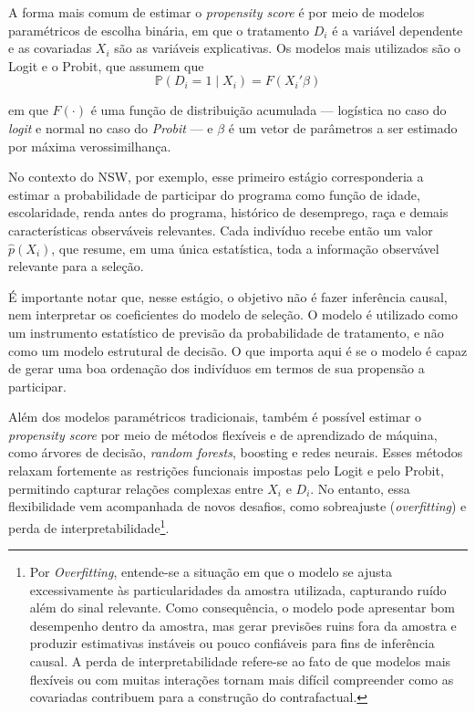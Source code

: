 A forma mais comum de estimar o \textit{propensity score} é por meio de modelos paramétricos de escolha binária, em que o tratamento $D_i$ é a variável dependente e as covariadas $X_i$ são as variáveis explicativas. Os modelos mais utilizados são o Logit e o Probit, que assumem que
$$
\mathbb{P}(D_i = 1 \mid X_i) = F(X_i'\beta)
$$

\noindent em que $F(\cdot)$ é uma função de distribuição acumulada --- logística no caso do \textit{logit} e normal no caso do \textit{Probit} --- e $\beta$ é um vetor de parâmetros a ser estimado por máxima verossimilhança.

No contexto do NSW, por exemplo, esse primeiro estágio corresponderia a estimar a probabilidade de participar do programa como função de idade, escolaridade, renda antes do programa, histórico de desemprego, raça e demais características observáveis relevantes. Cada indivíduo recebe então um valor $\hat{p}(X_i)$, que resume, em uma única estatística, toda a informação observável relevante para a seleção.

É importante notar que, nesse estágio, o objetivo não é fazer inferência causal, nem interpretar os coeficientes do modelo de seleção. O modelo é utilizado como um instrumento estatístico de previsão da probabilidade de tratamento, e não como um modelo estrutural de decisão. O que importa aqui é se o modelo é capaz de gerar uma boa ordenação dos indivíduos em termos de sua propensão a participar.

Além dos modelos paramétricos tradicionais, também é possível estimar o \textit{propensity score} por meio de métodos flexíveis e de aprendizado de máquina, como árvores de decisão, \textit{random forests}, boosting e redes neurais. Esses métodos relaxam fortemente as restrições funcionais impostas pelo Logit e pelo Probit, permitindo capturar relações complexas entre $X_i$ e $D_i$. No entanto, essa flexibilidade vem acompanhada de novos desafios, como sobreajuste (\textit{overfitting}) e perda de interpretabilidade\footnote{Por \textit{Overfitting}, entende-se a situação em que o modelo se ajusta excessivamente às particularidades da amostra utilizada, capturando ruído além do sinal relevante. Como consequência, o modelo pode apresentar bom desempenho dentro da amostra, mas gerar previsões ruins fora da amostra e produzir estimativas instáveis ou pouco confiáveis para fins de inferência causal. A perda de interpretabilidade refere-se ao fato de que modelos mais flexíveis ou com muitas interações tornam mais difícil compreender como as covariadas contribuem para a construção do contrafactual.}.

